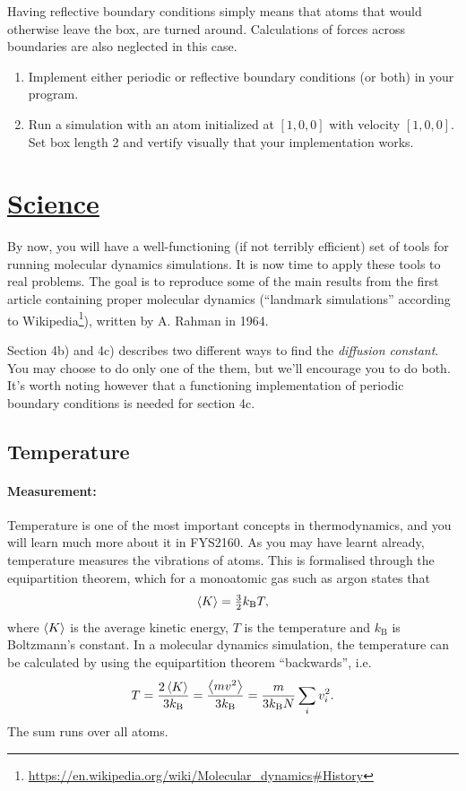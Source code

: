 \documentclass[11pt,british,a4paper]{report}
\begin{document}
Having reflective boundary conditions simply means that atoms that would otherwise leave the box, are turned around. Calculations of forces across boundaries are also neglected in this case.
\begin{enumerate}[label=\roman*.]
    \item Implement either periodic or reflective boundary conditions (or both) in your program.
    \item Run a simulation with an atom initialized at \([1,0,0]\) with velocity \([1,0,0]\). Set box length 2 and vertify visually that your implementation works.
\end{enumerate}


\section{\underline{Science}}
By now, you will have a well-functioning (if not terribly efficient) set of tools for running molecular dynamics simulations. It is now time to apply these tools to real problems. The goal is to reproduce some of the main results from the first article containing proper molecular dynamics (``landmark simulations'' according to Wikipedia\footnote{\url{https://en.wikipedia.org/wiki/Molecular_dynamics\#History}}), written by A. Rahman in 1964\cite{Rahman_1964}.

Section 4b) and 4c) describes two different ways to find the \textit{diffusion constant}. You may choose to do only one of the them, but we'll encourage you to do both. It's worth noting however that a functioning implementation of periodic boundary conditions is needed for section 4c.

\subsection{Temperature}
\paragraph{Measurement:} Temperature is one of the most important concepts in thermodynamics, and you will learn much more about it in FYS2160. As you may have learnt already, temperature measures the vibrations of atoms. This is formalised through the equipartition theorem, which for a monoatomic gas such as argon states that
\[
    \ev{K} = \tfrac{3}{2}k_\mathrm{B}T,
\]
where \(\ev{K}\) is the average kinetic energy, \(T\) is the temperature and \(k_\mathrm{B}\) is Boltzmann's constant. In a molecular dynamics simulation, the temperature can be calculated by using the equipartition theorem ``backwards'', i.e.
\[
    T = \frac{2\ev{K}}{3k_\mathrm{B}} = \frac{\ev{mv^2}}{3k_\mathrm{B}} = \frac{m}{3k_\mathrm{B}N}\sum_i v_i^2.
\]
The sum runs over all atoms.
\end{document}

